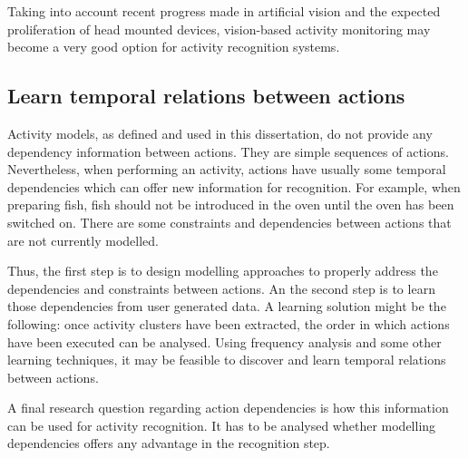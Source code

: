 Taking into account recent progress made in artificial vision and the expected proliferation of head mounted devices, vision-based activity monitoring may become a very good option for activity recognition systems.

\subsection{Learn temporal relations between actions}

Activity models, as defined and used in this dissertation, do not provide any dependency information between actions. They are simple sequences of actions. Nevertheless, when performing an activity, actions have usually some temporal dependencies which can offer new information for recognition. For example, when preparing fish, fish should not be introduced in the oven until the oven has been switched on. There are some constraints and dependencies between actions that are not currently modelled.

Thus, the first step is to design modelling approaches to properly address the dependencies and constraints between actions. An the second step is to learn those dependencies from user generated data. A learning solution might be the following: once activity clusters have been extracted, the order in which actions have been executed can be analysed. Using frequency analysis and some other learning techniques, it may be feasible to discover and learn temporal relations between actions. 

A final research question regarding action dependencies is how this information can be used for activity recognition. It has to be analysed whether modelling dependencies offers any advantage in the recognition step.

